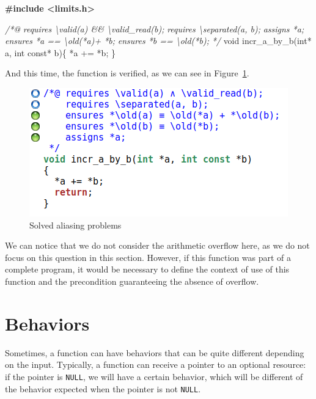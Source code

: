 \documentclass[12pt,francais,]{scrbook}
\newenvironment{Shaded}{}{}
\newcommand{\DataTypeTok}[1]{\textcolor[rgb]{0.56,0.13,0.00}{{#1}}}
\newcommand{\CommentTok}[1]{\textcolor[rgb]{0.38,0.63,0.69}{\textit{{#1}}}}
\newcommand{\ErrorTok}[1]{\textcolor[rgb]{1.00,0.00,0.00}{\textbf{{#1}}}}
\newcommand{\NormalTok}[1]{{#1}}
\begin{document}
\begin{footnotesize}\begin{Shaded}
\begin{Highlighting}[]
\ErrorTok{#include <limits.h>}

\CommentTok{/*@}
\CommentTok{  requires \textbackslash{}valid(a) && \textbackslash{}valid_read(b);}
\CommentTok{  requires \textbackslash{}separated(a, b);}
\CommentTok{  assigns  *a;}
\CommentTok{  ensures  *a == \textbackslash{}old(*a)+ *b;}
\CommentTok{  ensures  *b == \textbackslash{}old(*b);}
\CommentTok{*/}
\DataTypeTok{void} \NormalTok{incr_a_by_b(}\DataTypeTok{int}\NormalTok{* a, }\DataTypeTok{int} \DataTypeTok{const}\NormalTok{* b)\{}
  \NormalTok{*a += *b;}
\NormalTok{\}}
\end{Highlighting}
\end{Shaded}\end{footnotesize}

And this time, the function is verified, as we can see in
Figure~\ref{fig:2-2-2-incr_a_by_b-2}.

\begin{figure}[htbp]
\centering
\includegraphics[scale=0.5]{2-2-2-incr_a_by_b-2.png}
\caption{Solved aliasing problems}
\label{fig:2-2-2-incr_a_by_b-2}
\end{figure}

We can notice that we do not consider the arithmetic overflow here, as
we do not focus on this question in this section. However, if this
function was part of a complete program, it would be necessary to define
the context of use of this function and the precondition guaranteeing
the absence of overflow.

\section{Behaviors}\label{behaviors}

Sometimes, a function can have behaviors that can be quite different
depending on the input. Typically, a function can receive a pointer to
an optional resource: if the pointer is \texttt{NULL}, we will have a
certain behavior, which will be different of the behavior expected when
the pointer is not \texttt{NULL}.
\end{document}
